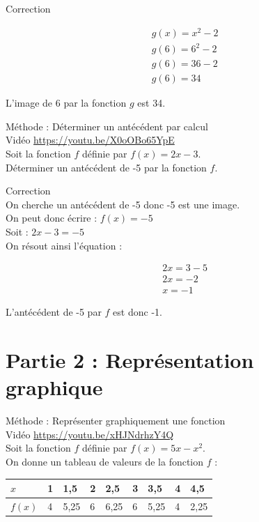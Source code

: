 \documentclass[10pt]{article}
\begin{document}
Correction

\[
\begin{aligned}
& g(x)=x^{2}-2 \\
& g(6)=6^{2}-2 \\
& g(6)=36-2 \\
& g(6)=34
\end{aligned}
\]

L'image de 6 par la fonction \(g\) est 34.

Méthode : Déterminer un antécédent par calcul\\
Vidéo \href{https://youtu.be/X0oOBo65YpE}{https://youtu.be/X0oOBo65YpE}\\
Soit la fonction \(f\) définie par \(f(x)=2 x-3\).\\
Déterminer un antécédent de -5 par la fonction \(f\).

Correction\\
On cherche un antécédent de -5 donc -5 est une image.\\
On peut donc écrire : \(f(x)=-5\)\\
Soit : \(2 x-3=-5\)\\
On résout ainsi l'équation :

\[
\begin{aligned}
& 2 x=3-5 \\
& 2 x=-2 \\
& x=-1
\end{aligned}
\]

L'antécédent de -5 par \(f\) est donc -1.

\section*{Partie 2 : Représentation graphique}
Méthode : Représenter graphiquement une fonction\\
Vidéo \href{https://youtu.be/xHJNdrhzY4Q}{https://youtu.be/xHJNdrhzY4Q}\\
Soit la fonction \(f\) définie par \(f(x)=5 x-x^{2}\).\\
On donne un tableau de valeurs de la fonction \(f\) :

\begin{center}
\begin{tabular}[t]{|l|l|l|l|l|l|l|l|l|}
\hline
\(x\) & 1 & 1,5 & 2 & 2,5 & 3 & 3,5 & 4 & 4,5 \\
\hline
\(f(x)\) & 4 & 5,25 & 6 & 6,25 & 6 & 5,25 & 4 & 2,25 \\
\hline
\end{tabular}
\end{center}
\end{document}
